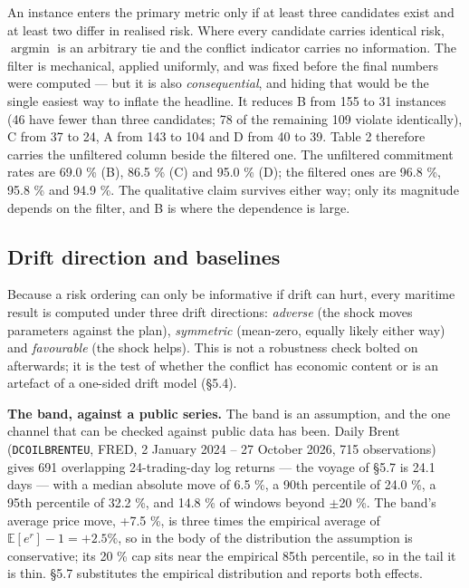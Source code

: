 \documentclass[preprint,12pt,letterpaper]{elsarticle}
\theoremstyle{definition}
\theoremstyle{plain}
\begin{document}
An instance enters the primary metric only if at least three candidates exist and at least two differ in realised risk. Where every candidate carries identical risk, $\operatorname{argmin}$ is an arbitrary tie and the conflict indicator carries no information. The filter is mechanical, applied uniformly, and was fixed before the final numbers were computed --- but it is also \textit{consequential}, and hiding that would be the single easiest way to inflate the headline. It reduces B from 155 to 31 instances (46 have fewer than three candidates; 78 of the remaining 109 violate identically), C from 37 to 24, A from 143 to 104 and D from 40 to 39. Table 2 therefore carries the unfiltered column beside the filtered one. The unfiltered commitment rates are 69.0 \% (B), 86.5 \% (C) and 95.0 \% (D); the filtered ones are 96.8 \%, 95.8 \% and 94.9 \%. The qualitative claim survives either way; only its magnitude depends on the filter, and B is where the dependence is large.

\subsection{Drift direction and baselines}

Because a risk ordering can only be informative if drift can hurt, every maritime result is computed under three drift directions: \textit{adverse} (the shock moves parameters against the plan), \textit{symmetric} (mean-zero, equally likely either way) and \textit{favourable} (the shock helps). This is not a robustness check bolted on afterwards; it is the test of whether the conflict has economic content or is an artefact of a one-sided drift model (\S 5.4).

\textbf{The band, against a public series.} The band is an assumption, and the one channel that can be checked against public data has been. Daily Brent (\texttt{DCOILBRENTEU}, FRED, 2 January 2024 -- 27 October 2026, 715 observations) gives 691 overlapping 24-trading-day log returns --- the voyage of \S 5.7 is 24.1 days --- with a median absolute move of 6.5 \%, a 90th percentile of 24.0 \%, a 95th percentile of 32.2 \%, and 14.8 \% of windows beyond $\pm$20 \%. The band's average price move, +7.5 \%, is three times the empirical average of $\mathbb{E}[e^{r}] - 1 = +2.5 \%$, so in the body of the distribution the assumption is conservative; its 20 \% cap sits near the empirical 85th percentile, so in the tail it is thin. \S 5.7 substitutes the empirical distribution and reports both effects.
\end{document}
